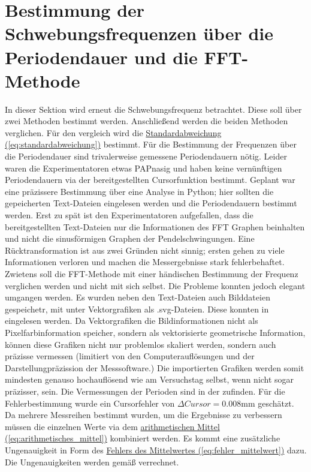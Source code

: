 \section[Schwebungsfrequenzen via FFT und T bestimmen]{Bestimmung der Schwebungsfrequenzen über die Periodendauer und die FFT-Methode}
\label{sec:A2}
In dieser Sektion wird erneut die Schwebungsfrequenz betrachtet. Diese soll über zwei Methoden bestimmt werden. Anschließend werden die beiden Methoden verglichen. Für den vergleich wird die \hyperref[eq:standardabweichung]{Standardabweichung (\ref*{eq:standardabweichung})} bestimmt. 
Für die Bestimmung der Frequenzen über die Periodendauer sind trivalerweise gemessene Periodendauern nötig. Leider waren die Experimentatoren etwas PAPnasig und haben keine vernünftigen Periodendauern via der bereitgestellten Cursorfunktion bestimmt. Geplant war eine präzissere Bestimmung über eine Analyse in Python; hier sollten die gepeicherten Text-Dateien eingelesen werden und die Periodendauern bestimmt werden. 
Erst zu spät ist den Experimentatoren aufgefallen, dass die bereitgestellten Text-Dateien nur die Informationen des FFT Graphen beinhalten und nicht die sinusförmigen Graphen der Pendelschwingungen. Eine Rücktransformation ist aus zwei Gründen nicht sinnig; ersten gehen zu viele Informationen verloren und machen die Messergebnisse stark fehlerbehaftet. Zwietens soll die FFT-Methode mit einer händischen Bestimmung der Frequenz verglichen werden und nicht mit sich selbst. 
Die Probleme konnten jedoch elegant umgangen werden. Es wurden neben den Text-Dateien auch Bilddateien gespeichetr, mit unter Vektorgrafiken als .svg-Dateien. Diese konnten in eingelesen werden. Da Vektorgrafiken die Bildinformationen nicht als Pixelfarbinformation speicher, sondern als vektorisierte geometrische Information, können diese Grafiken nicht nur problemlos skaliert werden, sondern auch präzisse vermessen (limitiert von den Computerauflösungen und der Darstellungpräzission der Messsoftware.) 
Die importierten Grafiken werden somit mindesten genauso hochauflösend wie am Versuchstag selbst, wenn nicht sogar präzisser, sein. Die Vermessungen der Perioden sind in der  zufinden. Für die Fehlerbestimmung wurde ein Cursorfehler von $\Delta Cursor = 0.008 \mathrm{mm}$ geschätzt. Da mehrere Messreihen bestimmt wurden, um die Ergebnisse zu verbessern müssen die einzelnen Werte via dem \hyperref[eq:arithmetisches_mittel]{arithmetischen Mittel (\ref*{eq:arithmetisches_mittel})} kombiniert werden. Es kommt eine zusätzliche Ungenauigkeit in Form des \hyperref[eq:fehler_mittelwert]{Fehlers des Mittelwertes (\ref*{eq:fehler_mittelwert})} dazu.
Die Ungenauigkeiten werden gemäß  verrechnet.

